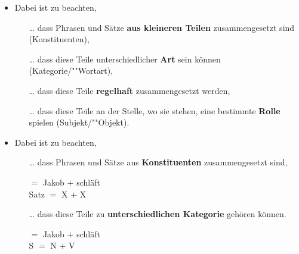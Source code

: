 \begin{frame}

\begin{itemize}

	\item Dabei ist zu beachten,
	
	\begin{itemize}
		\item[\dots] dass Phrasen und Sätze \textbf{aus kleineren Teilen} zusammengesetzt sind (Konstituenten),
		\item[]
		\item [\dots] dass diese Teile unterschiedlicher \textbf{Art} sein können (Kategorie/""Wortart),
		\item[]
		\item [\dots] dass diese Teile \textbf{regelhaft} zusammengesetzt werden,
		\item[]
		\item[\dots] dass diese Teile an der Stelle, wo sie stehen, eine bestimmte \textbf{Rolle} spielen (Subjekt/""Objekt).
 		
	\end{itemize}
	
\end{itemize}

\end{frame}


\begin{frame}

\begin{itemize}
\item Dabei ist zu beachten, 

\begin{itemize}
	\item [\dots] dass Phrasen und Sätze aus \textbf{Konstituenten} zusammengesetzt sind,

	\ea
	 $=$ Jakob $+$ schläft\\
	Satz $=$ X $+$ X \\
	\z

\pause

	\item [\dots] dass diese Teile zu \textbf{unterschiedlichen Kategorie} gehören können.

	\ea 
	 $=$ Jakob $+$ schläft\\
	S $=$ N $+$ V \\
	\z

\end{itemize}

\end{itemize}

\end{frame}


